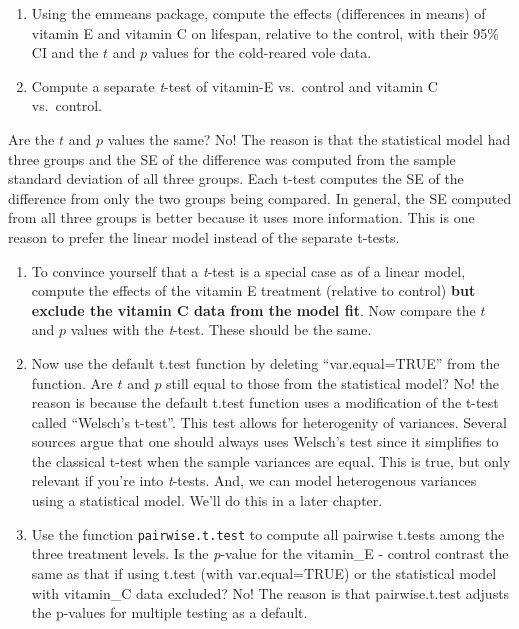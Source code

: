 \documentclass[]{book}
\providecommand{\tightlist}{%
  \setlength{\itemsep}{0pt}\setlength{\parskip}{0pt}}
\begin{document}
\begin{enumerate}
\def\labelenumi{\arabic{enumi}.}
\tightlist
\item
  Using the emmeans package, compute the effects (differences in means)
  of vitamin E and vitamin C on lifespan, relative to the control, with
  their 95\% CI and the \(t\) and \(p\) values for the cold-reared vole
  data.
\item
  Compute a separate \emph{t}-test of vitamin-E vs.~control and vitamin
  C vs.~control.
\end{enumerate}

Are the \(t\) and \(p\) values the same? No! The reason is that the
statistical model had three groups and the SE of the difference was
computed from the sample standard deviation of all three groups. Each
t-test computes the SE of the difference from only the two groups being
compared. In general, the SE computed from all three groups is better
because it uses more information. This is one reason to prefer the
linear model instead of the separate t-tests.

\begin{enumerate}
\def\labelenumi{\arabic{enumi}.}
\setcounter{enumi}{2}
\item
  To convince yourself that a \emph{t}-test is a special case as of a
  linear model, compute the effects of the vitamin E treatment (relative
  to control) \textbf{but exclude the vitamin C data from the model
  fit}. Now compare the \(t\) and \(p\) values with the \emph{t}-test.
  These should be the same.
\item
  Now use the default t.test function by deleting ``var.equal=TRUE''
  from the function. Are \(t\) and \(p\) still equal to those from the
  statistical model? No! the reason is because the default t.test
  function uses a modification of the t-test called ``Welsch's t-test''.
  This test allows for heterogenity of variances. Several sources argue
  that one should always uses Welsch's test since it simplifies to the
  classical t-test when the sample variances are equal. This is true,
  but only relevant if you're into \emph{t}-tests. And, we can model
  heterogenous variances using a statistical model. We'll do this in a
  later chapter.
\item
  Use the function \texttt{pairwise.t.test} to compute all pairwise
  t.tests among the three treatment levels. Is the \emph{p}-value for
  the vitamin\_E - control contrast the same as that if using t.test
  (with var.equal=TRUE) or the statistical model with vitamin\_C data
  excluded? No! The reason is that pairwise.t.test adjusts the p-values
  for multiple testing as a default.
\end{enumerate}
\end{document}
